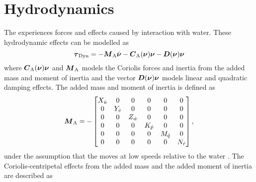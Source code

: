 \section{Hydrodynamics} 
The \abbrROV experiences forces and effects caused by interaction with water. These hydrodynamic effects can be modelled as 
\begin{equation}\label{eq:dyn}
 \boldsymbol{\tau}_\text{{Dyn}}=-\boldsymbol{M}_{\text{A}} \dot{\boldsymbol{\nu}} -\boldsymbol{C}_{\text{A}}(\boldsymbol{\nu})\boldsymbol{\nu} - \boldsymbol{D}(\boldsymbol{\nu})\boldsymbol{\nu}  
\end{equation} 
where $\boldsymbol{C}_{\text{A}}(\boldsymbol{\nu})\boldsymbol{\nu}$ and $\boldsymbol{M}_{\text{A}}$ models the Coriolis forces and inertia from the added mass and moment of inertia and the vector $\boldsymbol{D}(\boldsymbol{\nu})\boldsymbol{\nu}$ models linear and quadratic damping effects.
The added mass and moment of inertia is defined as
\begin{equation}
\boldsymbol{M}_\text{A} =
-\begin{bmatrix}
    X_{\dot{u}} & 0 & 0 & 0 & 0 & 0 \\
    0 & Y_{\dot{v}} & 0 & 0 & 0 & 0 \\
    0 & 0 & Z_{\dot{w}} & 0 & 0 & 0 \\
    0 & 0 & 0 & K_{\dot{p}}& 0 & 0 \\
    0 & 0 & 0 & 0 & M_{\dot{q}} & 0 \\
    0 & 0 & 0 & 0 & 0 & N_{\dot{r}} \\
    \end{bmatrix},
\end{equation}
under the assumption that the \abbrROV moves at low speeds relative to the water \citep[p. 121]{fossen2011}.
The Coriolis-centripetal effects from the added mass and the added moment of inertia are described as
